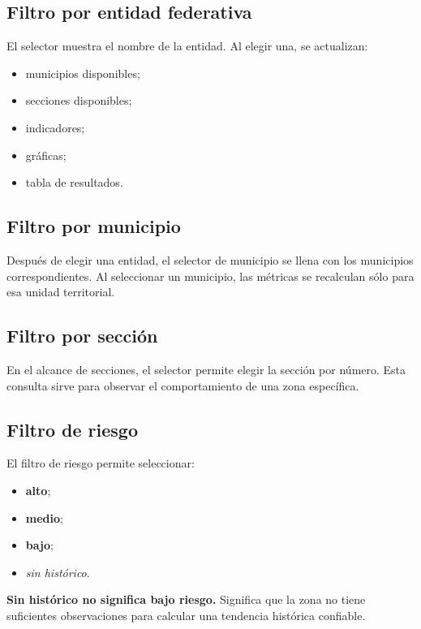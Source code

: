 \documentclass[11pt,a4paper]{article}
\newcommand{\alto}{\textcolor{riskred}{\textbf{alto}}}
\newcommand{\medio}{\textcolor{riskamber}{\textbf{medio}}}
\newcommand{\bajo}{\textcolor{riskgreen}{\textbf{bajo}}}
\begin{document}
\subsection{Filtro por entidad federativa}

El selector muestra el nombre de la entidad. Al elegir una, se actualizan:

\begin{itemize}
    \item municipios disponibles;
    \item secciones disponibles;
    \item indicadores;
    \item gráficas;
    \item tabla de resultados.
\end{itemize}

\subsection{Filtro por municipio}

Después de elegir una entidad, el selector de municipio se llena con los municipios correspondientes. Al seleccionar un municipio, las métricas se recalculan sólo para esa unidad territorial.

\subsection{Filtro por sección}

En el alcance de secciones, el selector permite elegir la sección por número. Esta consulta sirve para observar el comportamiento de una zona específica.

\subsection{Filtro de riesgo}

El filtro de riesgo permite seleccionar:

\begin{itemize}
    \item \alto{};
    \item \medio{};
    \item \bajo{};
    \item \textit{sin histórico}.
\end{itemize}

\begin{importante}
\textbf{Sin histórico no significa bajo riesgo.} Significa que la zona no tiene suficientes observaciones para calcular una tendencia histórica confiable.
\end{importante}
\end{document}
